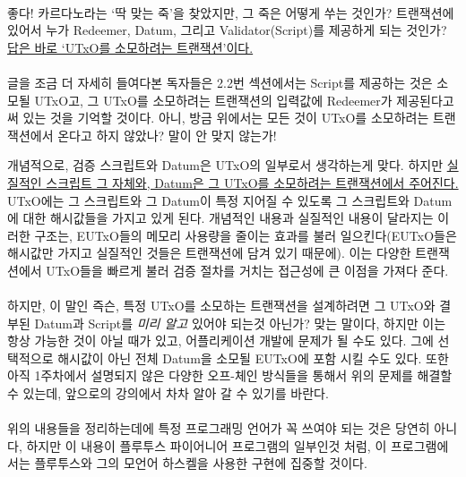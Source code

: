 \documentclass[a4paper, 11pt]{article}
\begin{document}
    \paragraph{} 좋다! 카르다노라는 `딱 맞는 죽'을 찾았지만, 그 죽은 어떻게 쑤는 것인가? 트랜잭션에 있어서 누가 Redeemer, Datum, 그리고 Validator(Script)를 제공하게 되는 것인가? \uline{답은 바로 `UTxO를 소모하려는 트랜잭션'이다.}

    \paragraph{} 글을 조금 더 자세히 들여다본 독자들은 2.2번 섹션에서는 Script를 제공하는 것은 소모될 UTxO고, 그 UTxO를 소모하려는 트랜잭션의 입력값에 Redeemer가 제공된다고 써 있는 것을 기억할 것이다. 아니, 방금 위에서는 모든 것이 UTxO를 소모하려는 트랜잭션에서 온다고 하지 않았나? 말이 안 맞지 않는가! 

    개념적으로, 검증 스크립트와 Datum은 UTxO의 일부로서 생각하는게 맞다. 하지만 \uline{실질적인 스크립트 그 자체와, Datum은 그 UTxO를 소모하려는 트랜잭션에서 주어진다.}  UTxO에는 그 스크립트와 그 Datum이 특정 지어질 수 있도록 그 스크립트와 Datum에 대한 해시값들을 가지고 있게 된다. 개념적인 내용과 실질적인 내용이 달라지는 이러한 구조는, EUTxO들의 메모리 사용량을 줄이는 효과를 불러 일으킨다(EUTxO들은 해시값만 가지고 실질적인 것들은 트랜잭션에 담겨 있기 때문에). 이는 다양한 트랜잭션에서 UTxO들을 빠르게 불러 검증 절차를 거치는 접근성에 큰 이점을 가져다 준다.

    \paragraph{} 하지만, 이 말인 즉슨, 특정 UTxO를 소모하는 트랜잭션을 설계하려면 그 UTxO와 결부된 Datum과 Script를 \emph{미리 알고} 있어야 되는것 아닌가? 맞는 말이다, 하지만 이는 항상 가능한 것이 아닐 때가 있고, 어플리케이션 개발에 문제가 될 수도 있다. 그에 선택적으로 해시값이 아닌 전체 Datum을 소모될 EUTxO에 포함 시킬 수도 있다. 또한 아직 1주차에서 설명되지 않은 다양한 오프-체인 방식들을 통해서 위의 문제를 해결할 수 있는데, 앞으로의 강의에서 차차 알아 갈 수 있기를 바란다.

    \paragraph{} 위의 내용들을 정리하는데에 특정 프로그래밍 언어가 꼭 쓰여야 되는 것은 당연히 아니다, 하지만 이 내용이 플루투스 파이어니어 프로그램의 일부인것 처럼, 이 프로그램에서는 플루투스와 그의 모언어 하스켈을 사용한 구현에 집중할 것이다.
\end{document}
